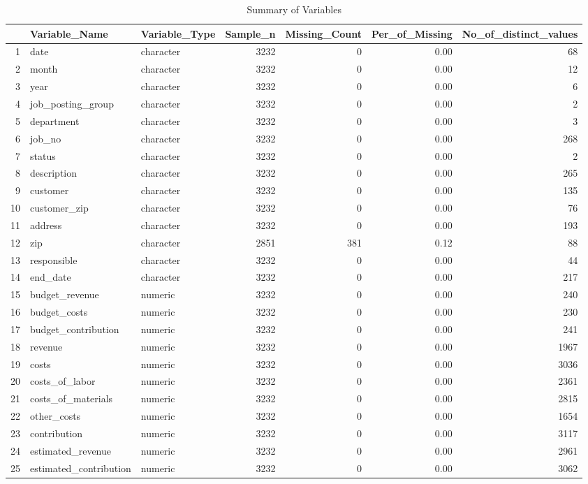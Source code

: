 \begin{sidewaystable}[ht]
\centering
\caption{Summary of Variables} 
\begin{tabular}{rllrrrr}
  \hline
 & Variable\_Name & Variable\_Type & Sample\_n & Missing\_Count & Per\_of\_Missing & No\_of\_distinct\_values \\ 
  \hline
1 & date & character & 3232 &   0 & 0.00 &  68 \\ 
  2 & month & character & 3232 &   0 & 0.00 &  12 \\ 
  3 & year & character & 3232 &   0 & 0.00 &   6 \\ 
  4 & job\_posting\_group & character & 3232 &   0 & 0.00 &   2 \\ 
  5 & department & character & 3232 &   0 & 0.00 &   3 \\ 
  6 & job\_no & character & 3232 &   0 & 0.00 & 268 \\ 
  7 & status & character & 3232 &   0 & 0.00 &   2 \\ 
  8 & description & character & 3232 &   0 & 0.00 & 265 \\ 
  9 & customer & character & 3232 &   0 & 0.00 & 135 \\ 
  10 & customer\_zip & character & 3232 &   0 & 0.00 &  76 \\ 
  11 & address & character & 3232 &   0 & 0.00 & 193 \\ 
  12 & zip & character & 2851 & 381 & 0.12 &  88 \\ 
  13 & responsible & character & 3232 &   0 & 0.00 &  44 \\ 
  14 & end\_date & character & 3232 &   0 & 0.00 & 217 \\ 
  15 & budget\_revenue & numeric & 3232 &   0 & 0.00 & 240 \\ 
  16 & budget\_costs & numeric & 3232 &   0 & 0.00 & 230 \\ 
  17 & budget\_contribution & numeric & 3232 &   0 & 0.00 & 241 \\ 
  18 & revenue & numeric & 3232 &   0 & 0.00 & 1967 \\ 
  19 & costs & numeric & 3232 &   0 & 0.00 & 3036 \\ 
  20 & costs\_of\_labor & numeric & 3232 &   0 & 0.00 & 2361 \\ 
  21 & costs\_of\_materials & numeric & 3232 &   0 & 0.00 & 2815 \\ 
  22 & other\_costs & numeric & 3232 &   0 & 0.00 & 1654 \\ 
  23 & contribution & numeric & 3232 &   0 & 0.00 & 3117 \\ 
  24 & estimated\_revenue & numeric & 3232 &   0 & 0.00 & 2961 \\ 
  25 & estimated\_contribution & numeric & 3232 &   0 & 0.00 & 3062 \\ 
   \hline
\end{tabular}
\end{sidewaystable}
